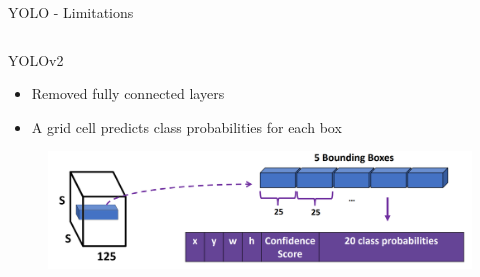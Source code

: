 \documentclass[10pt]{beamer}
\theoremstyle{remark}
\theoremstyle{definition}
\begin{document}
\begin{frame}{YOLO - Limitations}
\begin{columns}
\begin{column}{0.5\textwidth}
        
    \end{column}
\end{columns}
\end{frame}

\begin{frame}{YOLOv2}
\begin{itemize}
    \item Removed fully connected layers
    \item A grid cell predicts class probabilities for each box
\end{itemize}
\begin{figure}
\centering
\includegraphics[width=1.0\textwidth,height=1.0\textheight,keepaspectratio]{./images/yolo_17.png}
\end{figure}

    
\end{frame}
\end{document}
